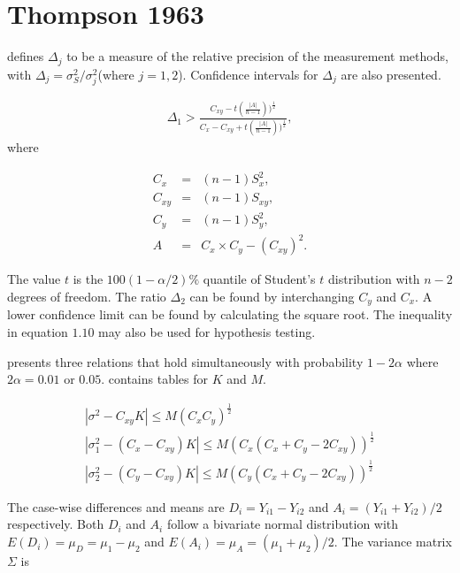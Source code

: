 \documentclass[12pt, a4paper]{report}
\theoremstyle{plain}
\theoremstyle{definition}
\theoremstyle{remark}
\begin{document}
	
	

		\section{Thompson 1963}
		
		
		\citet{Thompson} defines $\Delta_{j}$ to be a measure of the
		relative precision of the measurement methods, with $\Delta_{j}=
		\sigma^2_{S}/\sigma^2_{j}$(where $j=1,2$). Confidence intervals
		for $\Delta_{j}$ are also presented.
		
		\begin{eqnarray}
		\Delta_{1} > \frac{C_{xy}-
			t(\frac{|A|}{n-1}))^{\frac{1}{2}}}{C_{x}-C_{xy}+
			t(\frac{|A|}{n-1}))^{\frac{1}{2}}},
		\end{eqnarray}
		where
		
		\begin{eqnarray}
		C_{x}&=&(n-1)S^2_{x},\nonumber\\
		C_{xy}&=&(n-1)S_{xy},\nonumber\\
		C_{y}&=&(n-1)S^2_{y},\nonumber\\
		A &=& C_{x}\times C_{y} - (C_{xy})^2 . \nonumber
		\end{eqnarray}
		
		The value $t$ is the $100(1-\alpha/2)\%$ quantile of Student's $t$
		distribution with $n-2$ degrees of freedom. The ratio $\Delta_{2}$
		can be found by interchanging $C_{y}$ and $C_{x}$. A lower
		confidence limit can be found by calculating the square root. The
		inequality in equation $1.10$ may also be used for hypothesis
		testing.
		
		\citet{Thompson} presents three relations that hold simultaneously
		with probability $1-2\alpha$ where $2\alpha=0.01$ or $0.05$. \citet{Thompson} contains tables for $K$ and $M$.
		
		\begin{eqnarray}
			|\sigma^2-C_{xy}K|\leqslant M(C_{x}C_{y})^{\frac{1}{2}}\\
			|\sigma^2_{1}-(C_{x}-C_{xy})K|\leqslant M(C_{x}(C_{x}+C_{y}-2C_{xy}))^{\frac{1}{2}}\nonumber\\
			|\sigma^2_{2}-(C_{y}-C_{xy})K|\leqslant
			M(C_{y}(C_{x}+C_{y}-2C_{xy}))^{\frac{1}{2}}\nonumber
		\end{eqnarray}
		
	
		
		The case-wise differences and means are $D_{i} = Y_{i1}-Y_{i2}$
		and $A_{i} = (Y_{i1}+Y_{i2})/2$  respectively. Both $D_{i}$ and
		$A_{i}$ follow a bivariate normal distribution with $E(D_{i})=
		\mu_{D} = \mu_{1} - \mu_{2}$ and $E(A_{i})= \mu_{A} = (\mu_{1} +
		\mu_{2})/2$. The variance matrix $\Sigma$ is
		
\end{document}
